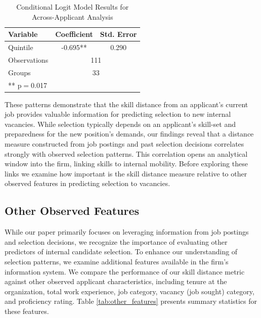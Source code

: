 \documentclass[12pt]{article}
\begin{document}
\begin{table}[h]
    \centering
    \caption{Conditional Logit Model Results for Across-Applicant Analysis}
    \renewcommand{\arraystretch}{1.2}
    \begin{tabular}{lcc}
    \hline
    \textbf{Variable} & \textbf{Coefficient} & \textbf{Std. Error} \\
    \hline
    Quintile & -0.695** & 0.290 \\
    \hline
    Observations & \multicolumn{2}{c}{111} \\
    Groups & \multicolumn{2}{c}{33} \\
    \hline
    \multicolumn{3}{l}{\footnotesize{** p$=$0.017}} \\
    \end{tabular}
    \label{tab:across_applicant}
\end{table}


These patterns demonstrate that the skill distance from an applicant's current job provides valuable information for predicting selection to new internal vacancies. While selection typically depends on an applicant's skill-set and preparedness for the new position's demands, our findings reveal that a distance measure constructed from job postings and past selection decisions correlates strongly with observed selection patterns. This correlation opens an analytical window into the firm, linking skills to internal mobility. Before exploring these links we examine how important is the skill distance measure relative to other observed features in predicting selection to vacancies.



\subsection{Other Observed Features}

While our paper primarily focuses on leveraging information from job postings and selection decisions, we recognize the importance of evaluating other predictors of internal candidate selection. To enhance our understanding of selection patterns, we examine additional features available in the firm's information system. We compare the performance of our skill distance metric against other observed applicant characteristics, including tenure at the organization, total work experience, job category, vacancy (job sought) category, and proficiency rating. Table \ref{tab:other_features} presents summary statistics for these features. 
\end{document}
